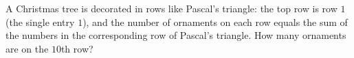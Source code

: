 A Christmas tree is decorated in rows like Pascal's triangle: the top row is row $1$ (the single entry $1$), and the number of ornaments on each row equals the sum of the numbers in the corresponding row of Pascal's triangle. How many ornaments are on the $10$th row?
